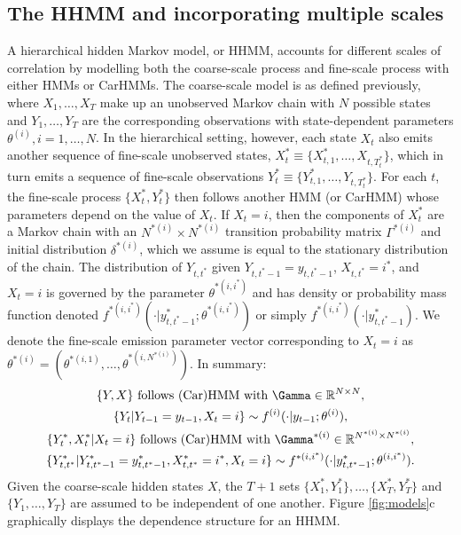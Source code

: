 \subsection{The HHMM and incorporating multiple scales}

A hierarchical hidden Markov model, or HHMM, accounts for different scales of correlation by modelling both the coarse-scale process and fine-scale process with either HMMs \citep{Barajas:2017,Adam:2019} or CarHMMs. The coarse-scale model is as defined previously, where $X_1, \ldots, X_T$ make up an unobserved Markov chain with $N$ possible states and $Y_1,\ldots, Y_T$ are the corresponding observations with state-dependent parameters $\theta^{(i)}, i = 1,\ldots,N$.   
%
In the hierarchical setting, however, each state $X_t$ also emits another sequence of fine-scale unobserved states, $X_t^* \equiv \{X_{t,1}^*,\ldots, X_{t,T_t^*}\}$, which in turn emits a sequence of fine-scale observations $Y_t^* \equiv \{Y_{t,1}^*,\ldots, Y_{t,T_t^*}\}$. For each $t$, the fine-scale process $\{X_t^*, Y_t^*\}$ then follows another HMM (or CarHMM) whose parameters depend on the value of $X_t$. If $X_t = i$, then the components of $X_t^*$ are a Markov chain with an $N^{*(i)} \times N^{*(i)}$ transition probability matrix $\Gamma^{*(i)}$ and initial distribution $\delta^{*(i)}$, which we assume is equal to the stationary distribution of the chain. The distribution of $Y_{t,t^*}$ given $Y_{t,t^*-1} = y_{t,t^*-1}$, $X_{t,t^*}=i^*$, and $X_t=i$ is governed by the parameter $\theta^{*(i,i^*)}$ and has density or probability mass function denoted $f^{*(i,i^*)}\left(\cdot|y^*_{t,t^*-1}; \theta^{*(i,i^*)}\right)$ or simply $f^{*(i,i^*)}(\cdot|y^*_{t,t^*-1})$. We denote the fine-scale emission parameter vector corresponding to $X_t=i$ as $\theta^{*(i)}=\left(\theta^{*(i,1)}, \ldots, \theta^{*(i,N^{*(i)})}\right)$. In summary:
%
%
\begin{gather*}
    \{Y, X\} \text{ follows (Car)HMM with } \Gamma \in \bbR^{N \times N}, \\
    \{Y_t   | Y_{t-1} = y_{t-1}, X_t = i\} \sim f^{(i)}(\cdot|y_{t-1};\theta^{(i)}), \\
    \{Y^*_t,X^*_t | X_t = i\} \text{ follows (Car)HMM with } \Gamma^{*(i)} \in \bbR^{N^{*(i)} \times N^{*(i)}}, \\
    \{Y^*_{t,t^*} | Y^*_{t,t^*-1} = y^*_{t,t^*-1}, X^*_{t,t^*} = i^*, X_t = i\} \sim f^{*(i,i^*)}(\cdot|y^{*}_{t,t^*-1};\theta^{(i,i^*)}).
\end{gather*}
Given the coarse-scale hidden states $X$, the $T+1$ sets $\{X_1^*, Y_1^*\}, \ldots, \{X_T^*, Y_T^*\}$ and $\{Y_1,\ldots,Y_T\}$ are assumed to be independent of one another. Figure \ref{fig:models}c graphically displays the dependence structure for an HHMM.
%
%

